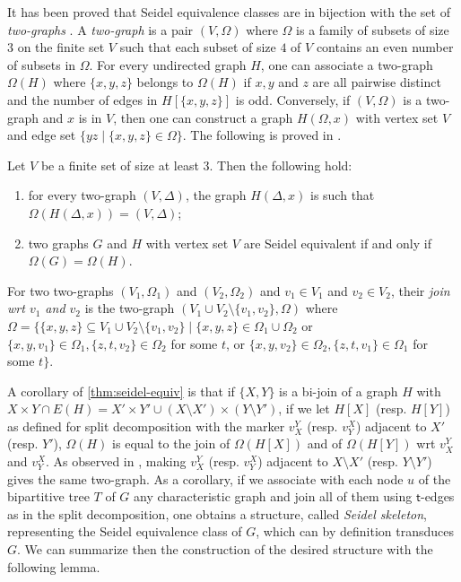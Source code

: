 \documentclass{lmcs} %
\begin{document}
It has been proved that Seidel equivalence classes are in bijection with the set of \emph{two-graphs} \cite{seidel1991}. A \emph{two-graph} is a pair
$(V,\Omega)$ where
 $\Omega$ is a family of subsets of size $3$ on the finite set $V$ such that each subset of size $4$ of $V$ contains an even number of subsets in $\Omega$. For
 every undirected graph $H$, one can associate a two-graph $\Omega(H)$ where $\{x,y,z\}$ belongs to $\Omega(H)$ if $x,y$ and $z$ are all pairwise distinct and
 the number of edges in $H[\{x,y,z\}]$ is odd. Conversely, if $(V,\Omega)$ is a two-graph and $x$ is in $V$, then one can construct a graph $H(\Omega,x)$ with vertex set $V$ and edge
 set $\{yz\mid \{x,y,z\}\in \Omega\}$. The following is proved in \cite{ehrenfeuchtHR1999,seidel1991}.

 \begin{thmC}\label{thm:seidel-equiv} Let $V$ be a finite set of size at least $3$. Then the following hold:
   \begin{enumerate}
   \item for every two-graph $(V,\Delta)$, the graph $H(\Delta,x)$ is such that $\Omega(H(\Delta,x))=(V,\Delta)$;
   \item two graphs $G$ and $H$ with vertex set $V$ are Seidel equivalent if and only if $\Omega(G)=\Omega(H)$.
   \end{enumerate}
 \end{thmC}


 For two two-graphs $(V_1,\Omega_1)$ and $(V_2,\Omega_2)$ and $v_1 \in V_1$ and $v_2\in V_2$, their \emph{join wrt $v_1$ and $v_2$} is the two-graph $(V_1\cup V_2\setminus
 \{v_1,v_2\},\Omega)$ where $\Omega = \{\{x,y,z\} \subseteq V_1\cup V_2\setminus
 \{v_1,v_2\}\mid \{x,y,z\}\in \Omega_1 \cup \Omega_2$ or $\{x,y,v_1\}\in \Omega_1, \{z,t,v_2\}\in \Omega_2$ for some $t$, or $\{x,y,v_2\}\in \Omega_2, \{z,t,v_1\}\in \Omega_1$ for some $t\}$.

 A corollary of \autoref{thm:seidel-equiv} is that if $\{X,Y\}$ is a bi-join of a graph $H$ with
 $X\times Y\cap E(H) = X'\times Y' \cup (X\setminus X')\times (Y\setminus Y')$, if we let $H[X]$ (resp. $H[Y]$) as defined for split decomposition with the
 marker $v_X^Y$ (resp. $v_Y^X$) adjacent to $X'$ (resp. $Y'$), $\Omega(H)$ is equal to the join of $\Omega(H[X])$ and of $\Omega(H[Y])$ wrt $v_X^Y$ and
 $v_Y^X$. As observed in \cite{raoThesis}, making $v_X^Y$ (resp. $v_Y^X$) adjacent to $X\setminus X'$ (resp. $Y\setminus Y'$) gives the same two-graph. As a corollary, if we associate with each node $u$ of the bipartitive tree $T$ of $G$ any characteristic graph and join all of them using $\textsf{t}$-edges as in the
split decomposition, one obtains a structure, called \emph{Seidel skeleton}, representing the Seidel equivalence class of $G$, which can by definition transduces $G$. We can summarize then the construction of the desired structure with the following lemma.
\end{document}
